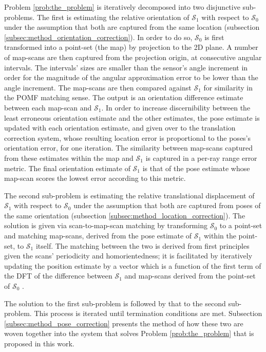 Problem \ref{prob:the_problem} is iteratively decomposed into two disjunctive
sub-problems. The first is estimating the relative orientation of
$\mathcal{S}_1$ with respect to $\mathcal{S}_0$ under the assumption that both
are captured from the same location (subsection
\ref{subsec:method_orientation_correction}). In order to do so, $\mathcal{S}_0$ is
first transformed into a point-set (the map) by projection to the 2D plane. A
number of map-scans are then captured from the projection origin, at
consecutive angular intervals. The intervals' sizes are smaller than the
sensor's angle increment in order for the magnitude of the angular
approximation error to be lower than the angle increment.  The map-scans are
then compared against $\mathcal{S}_1$ for similarity in the POMF matching
sense. The output is an orientation difference estimate between each map-scan
and $\mathcal{S}_1$. In order to increase discernibility between the least
erroneous orientation estimate and the other estimates, the pose estimate is
updated with each orientation estimate, and given over to the translation
correction system, whose resulting location error is proportional to the
poses's orientation error, for one iteration. The similarity between map-scans
captured from these estimates within the map and $\mathcal{S}_1$ is captured in
a per-ray range error metric. The final orientation estimate of $\mathcal{S}_1$
is that of the pose estimate whose map-scan scores the lowest error according
to this metric.

The second sub-problem is estimating the relative translational displacement of
$\mathcal{S}_1$ with respect to $\mathcal{S}_0$ under the assumption that both
are captured from poses of the same orientation (subsection
\ref{subsec:method_location_correction}). The solution is given via
scan-to-map-scan matching by transforming $\mathcal{S}_0$ to a point-set and
matching map-scans, derived from the pose estimate of $\mathcal{S}_1$ within
the point-set, to $\mathcal{S}_1$ itself. The matching between the two is
derived from first principles given the scans' periodicity and homorientedness;
it is facilitated by iteratively updating the position estimate by a vector
which is a function of the first term of the DFT of the difference between
$\mathcal{S}_1$ and map-scans derived from the point-set of $\mathcal{S}_0$
\cite{icte}.

The solution to the first sub-problem is followed by that to the second
sub-problem. This process is iterated until termination conditions are met.
Subsection \ref{subsec:method_pose_correction} presents the method of how these
two are woven together into the system that solves Problem
\ref{prob:the_problem} that is proposed in this work.

